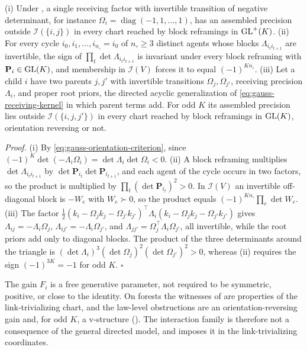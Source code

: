 (i) Under , a single receiving factor with
invertible transition of negative determinant, for instance
\(\Omega_i=\operatorname{diag}(-1,1,\dots,1)\), has an assembled precision
outside \(\mathcal I(\{i,j\})\) in every chart reached by block reframings in
\(\mathrm{GL}^+(K)\).
(ii) For every cycle \(i_0,i_1,\dots,i_{n_\circ}=i_0\) of \(n_\circ\geq3\)
distinct agents whose blocks \(\Lambda_{i_ti_{t+1}}\) are invertible, the sign
of \(\prod_{t}\det\Lambda_{i_ti_{t+1}}\) is invariant under every block
reframing with \(\mathbf P_i\in\mathrm{GL}(K)\), and membership in \(\mathcal I(V)\) forces it
to equal \((-1)^{Kn_\circ}\).
(iii) Let a child \(i\) have two parents \(j,j'\) with invertible transitions
\(\Omega_j,\Omega_{j'}\), receiving precision \(\Lambda_i\), and proper root
priors, the directed acyclic generalization of \eqref{eq:gauss-receiving-kernel}
in which parent terms add. For odd \(K\) its assembled precision lies outside
\(\mathcal I(\{i,j,j'\})\) in every chart reached by block reframings in
\(\mathrm{GL}(K)\), orientation reversing or not. 

\noindent\emph{Proof.}
(i) By \eqref{eq:gauss-orientation-criterion}, since
\((-1)^K\det(-\Lambda_i\Omega_i)=\det\Lambda_i\det\Omega_i<0\). (ii) A block
reframing multiplies \(\det\Lambda_{i_ti_{t+1}}\) by
\(\det \mathbf P_{i_t}\det \mathbf P_{i_{t+1}}\), and each agent of the cycle occurs in two
factors, so the product is multiplied by \(\prod_t(\det \mathbf P_{i_t})^2>0\). In
\(\mathcal I(V)\) an invertible off-diagonal block is \(-W_e\) with
\(W_e\succ0\), so the product equals \((-1)^{Kn_\circ}\prod_e\det W_e\).
(iii) The factor
\(\tfrac12(k_i-\Omega_jk_j-\Omega_{j'}k_{j'})^\top\Lambda_i(k_i-\Omega_jk_j-\Omega_{j'}k_{j'})\)
gives \(\Lambda_{ij}=-\Lambda_i\Omega_j\), \(\Lambda_{ij'}=-\Lambda_i\Omega_{j'}\),
and \(\Lambda_{jj'}=\Omega_j^\top\Lambda_i\Omega_{j'}\), all invertible, while the
root priors add only to diagonal blocks. The product of the three determinants
around the triangle is
\((\det\Lambda_i)^3(\det\Omega_j)^2(\det\Omega_{j'})^2>0\), whereas (ii) requires
the sign \((-1)^{3K}=-1\) for odd \(K\). \(\square\)

The gain \(F_i\) is a free generative parameter, not required to be symmetric,
positive, or close to the identity. On forests the witnesses of
 are properties of the
link-trivializing chart, and the law-level obstructions are an
orientation-reversing gain and, for odd \(K\), a v-structure
(). The interaction family is therefore
not a consequence of the general directed model, and
 imposes it in the link-trivializing
coordinates.

